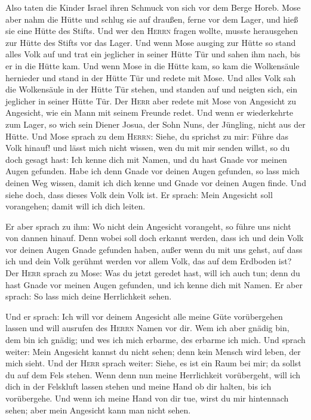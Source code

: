  Also taten die Kinder Israel ihren Schmuck von sich vor
dem Berge Horeb.  Mose aber nahm die Hütte und schlug sie
auf draußen, ferne vor dem Lager, und hieß sie eine Hütte des Stifts.
Und wer den \textsc{Herrn} fragen wollte, musste herausgehen zur Hütte
des Stifts vor das Lager.  Und wenn Mose ausging zur Hütte
so stand alles Volk auf und trat ein jeglicher in seiner Hütte Tür und
sahen ihm nach, bis er in die Hütte kam.  Und wenn Mose in
die Hütte kam, so kam die Wolkensäule hernieder und stand in der Hütte
Tür und redete mit Mose.  Und alles Volk sah die
Wolkensäule in der Hütte Tür stehen, und standen auf und neigten sich,
ein jeglicher in seiner Hütte Tür.  Der \textsc{Herr}
aber redete mit Mose von Angesicht zu Angesicht, wie ein Mann mit seinem
Freunde redet. Und wenn er wiederkehrte zum Lager, so wich sein Diener
Josua, der Sohn Nuns, der Jüngling, nicht aus der Hütte. 
Und Mose sprach zu dem \textsc{Herrn}: Siehe, du sprichst zu mir: Führe
das Volk hinauf! und lässt mich nicht wissen, wen du mit mir senden
willst, so du doch gesagt hast: Ich kenne dich mit Namen, und du hast
Gnade vor meinen Augen gefunden.  Habe ich denn Gnade vor
deinen Augen gefunden, so lass mich deinen Weg wissen, damit ich dich
kenne und Gnade vor deinen Augen finde. Und siehe doch, dass dieses Volk
dein Volk ist.  Er sprach: Mein Angesicht soll
vorangehen; damit will ich dich leiten.

 Er aber sprach zu ihm: Wo nicht dein Angesicht
vorangeht, so führe uns nicht von dannen hinauf.  Denn
wobei soll doch erkannt werden, dass ich und dein Volk vor deinen Augen
Gnade gefunden haben, außer wenn du mit uns gehst, auf dass ich und dein
Volk gerühmt werden vor allem Volk, das auf dem Erdboden ist?
 Der \textsc{Herr} sprach zu Mose: Was du jetzt geredet
hast, will ich auch tun; denn du hast Gnade vor meinen Augen gefunden,
und ich kenne dich mit Namen.  Er aber sprach: So lass
mich deine Herrlichkeit sehen.

 Und er sprach: Ich will vor deinem Angesicht alle meine
Güte vorübergehen lassen und will ausrufen des \textsc{Herrn} Namen vor
dir. Wem ich aber gnädig bin, dem bin ich gnädig; und wes ich mich
erbarme, des erbarme ich mich.  Und sprach weiter: Mein
Angesicht kannst du nicht sehen; denn kein Mensch wird leben, der mich
sieht.  Und der \textsc{Herr} sprach weiter: Siehe, es
ist ein Raum bei mir; da sollst du auf dem Fels stehen. 
Wenn denn nun meine Herrlichkeit vorübergeht, will ich dich in der
Felskluft lassen stehen und meine Hand ob dir halten, bis ich
vorübergehe.  Und wenn ich meine Hand von dir tue, wirst
du mir hintennach sehen; aber mein Angesicht kann man nicht sehen.

